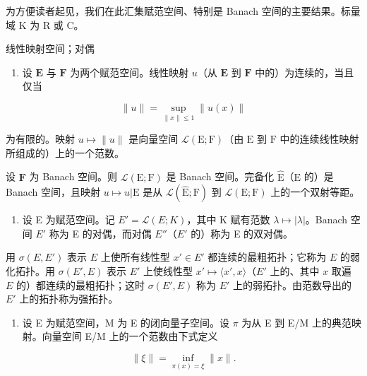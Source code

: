 
为方便读者起见，我们在此汇集赋范空间、特别是 Banach 空间的主要结果。标量域 K 为 R 或 C。

线性映射空间；对偶

\begin{enumerate}
\def\labelenumi{\arabic{enumi})}
\tightlist
\item
  设 \(\mathbf{E}\) 与 \(\mathbf{F}\) 为两个赋范空间。线性映射 \(u\)（从 \(\mathbf{E}\) 到 \(\mathbf{F}\) 中的）为连续的，当且仅当
\end{enumerate}

\[
\| u \| = \sup _ {\| x \| \leqslant 1} \| u (x) \|\tag{1}
\]

为有限的。映射 \(u \mapsto \| u \|\) 是向量空间 \(\mathcal{L}(\mathrm{E};\mathrm{F})\)（由 \(\mathrm{E}\) 到 \(\mathrm{F}\) 中的连续线性映射所组成的）上的一个范数。

设 \(\mathbf{F}\) 为 Banach 空间。则 \(\mathcal{L}(\mathrm{E};\mathrm{F})\) 是 Banach 空间。完备化 \(\hat{\mathrm{E}}\)（\(\mathrm{E}\) 的）是 Banach 空间，且映射 \(u\mapsto u|\mathrm{E}\) 是从 \(\mathcal{L}(\hat{\mathrm{E}};\mathrm{F})\) 到 \(\mathcal{L}(\mathrm{E};\mathrm{F})\) 上的一个双射等距。

\begin{enumerate}
\def\labelenumi{\arabic{enumi})}
\setcounter{enumi}{1}
\tightlist
\item
  设 E 为赋范空间。记 \(E' = \mathcal{L}(E; K)\)，其中 K 赋有范数 \(\lambda \mapsto |\lambda|\)。Banach 空间 \(E'\) 称为 E 的对偶，而对偶 \(E''\)（\(E'\) 的）称为 E 的双对偶。
\end{enumerate}

用 \(\sigma(E, E')\) 表示 \(E\) 上使所有线性型 \(x' \in E'\) 都连续的最粗拓扑；它称为 \(E\) 的弱化拓扑。用 \(\sigma(E', E)\) 表示 \(E'\) 上使线性型 \(x' \mapsto \langle x', x \rangle\)（\(E'\) 上的、其中 \(x\) 取遍 \(E\) 的）都连续的最粗拓扑；这时 \(\sigma(E', E)\) 称为 \(E'\) 上的弱拓扑。由范数导出的 \(E'\) 上的拓扑称为强拓扑。

\begin{enumerate}
\def\labelenumi{\arabic{enumi})}
\setcounter{enumi}{2}
\tightlist
\item
  设 E 为赋范空间，M 为 E 的闭向量子空间。设 \(\pi\) 为从 E 到 E/M 上的典范映射。向量空间 E/M 上的一个范数由下式定义
\end{enumerate}

\[
\| \xi \| = \inf _ {\pi (x) = \xi} \| x \|.\tag{2}
\]

